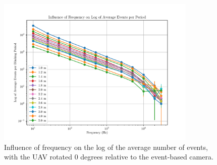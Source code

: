 \begin{figure}[H]
    \centering
    \includegraphics[width=0.85\textwidth]{./fig/semestral/freqlog.pdf}
    \caption{
        Influence of frequency on the log of the average number of events, with the UAV rotated 0 degrees relative to the event-based camera.
    }
    \label{fig:freqs}
\end{figure}

